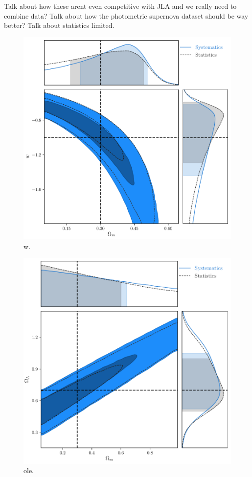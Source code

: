 \documentclass[a4paper,fleqn,usenatbib]{mnras}
\newcommand{\red}{\color{red}}
\begin{document}
{\red Talk about how these arent even competitive with JLA and we really need to combine data? Talk about how the photometric supernova dataset should be way better? Talk about statistics limited.}

\begin{figure}
	\begin{center}
		\includegraphics[width=\columnwidth]{combined_ApproximateModelW.pdf}
	\end{center}
	\caption{w.}
	\label{fig:combined_w}
\end{figure}
\begin{figure}
	\begin{center}
		\includegraphics[width=\columnwidth]{combined_ApproximateModelOl.pdf}
	\end{center}
	\caption{ole.}
	\label{fig:combined_ol}
\end{figure}
\end{document}
